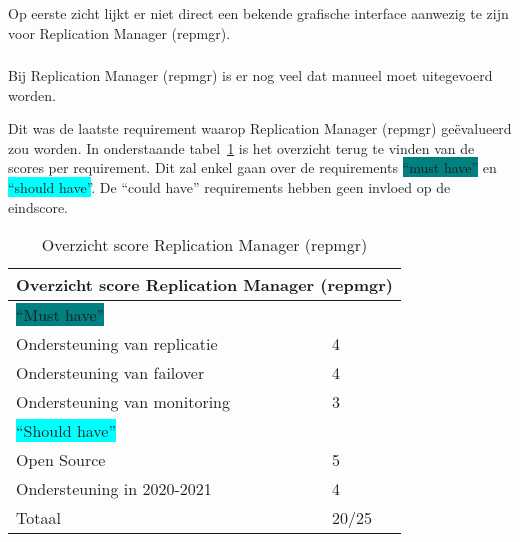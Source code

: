 Op eerste zicht lijkt er niet direct een bekende grafische interface aanwezig te zijn voor Replication Manager (repmgr).

\subsubsection{}
\label{subsubsec:Beperkte manuele interventie}

Bij Replication Manager (repmgr) is er nog veel dat manueel moet uitegevoerd worden.


Dit was de laatste requirement waarop Replication Manager (repmgr) geëvalueerd zou worden. In onderstaande tabel~\ref{table:Overzicht score Replication Manager (repmgr)} is het overzicht terug te vinden van de scores per requirement. Dit zal enkel gaan over de requirements \colorbox{teal}{“must have”} en \colorbox{cyan}{“should have”}. De “could have” requirements hebben geen invloed op de eindscore.

\begin{table}[!h]
    \centering
    \begin{tabular}{ |p{6cm}||p{6cm}|  }
        \hline
        \multicolumn{2}{|c|}{Overzicht score Replication Manager (repmgr)} \\
        \hline
        \colorbox{teal}{“Must have”} & \\
        \hline
        Ondersteuning van replicatie  & 4 \\
        Ondersteuning van failover &  4 \\
        Ondersteuning van monitoring & 3 \\
        \hline
        \colorbox{cyan}{“Should have”} & \\
        \hline
        Open Source &  5 \\
        Ondersteuning in 2020-2021 & 4 \\
        \hline
        \hline
        Totaal & 20/25 \\
        \hline
    \end{tabular}
    \caption{Overzicht score Replication Manager (repmgr)}
    \label{table:Overzicht score Replication Manager (repmgr)}
\end{table}